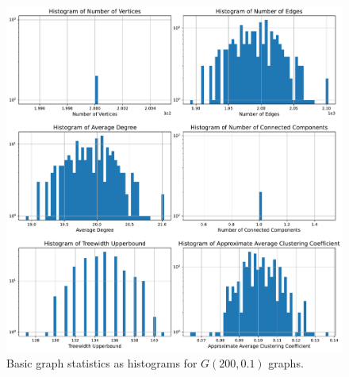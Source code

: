 \documentclass{article}
\begin{document}
\begin{figure}[H]
     \centering
     \includegraphics[width=\textwidth]{figures/erdos_reyni_small}
     \caption{Basic graph statistics as histograms for $G(200, 0.1)$ graphs.}
     \label{fig:erdos_reyni_small}
\end{figure}
\end{document}
